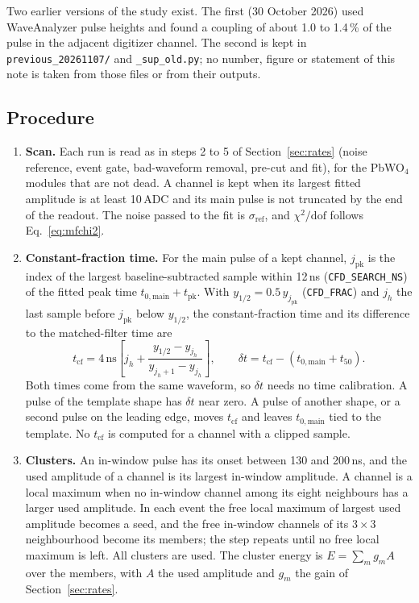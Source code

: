 \documentclass[11pt]{article}
\newcommand{\ns}{\,\mathrm{ns}}
\newcommand{\code}[1]{\texttt{#1}}
\begin{document}
Two earlier versions of the study exist. The first (30 October 2026) used WaveAnalyzer pulse heights and found a coupling of about 1.0 to 1.4\,\% of the pulse in the adjacent digitizer channel. The second is kept in \code{previous\_20261107/} and \code{\_sup\_old.py}; no number, figure or statement of this note is taken from those files or from their outputs.

\subsection{Procedure}

\begin{enumerate}
\item \textbf{Scan.} Each run is read as in steps 2 to 5 of Section~\ref{sec:rates} (noise reference, event gate, bad-waveform removal, pre-cut and fit), for the PbWO$_4$ modules that are not dead. A channel is kept when its largest fitted amplitude is at least 10\,ADC and its main pulse is not truncated by the end of the readout. The noise passed to the fit is $\sigma_{\mathrm{ref}}$, and $\chi^2/\mathrm{dof}$ follows Eq.~\eqref{eq:mfchi2}.
\item \textbf{Constant-fraction time.} For the main pulse of a kept channel, $j_{\mathrm{pk}}$ is the index of the largest baseline-subtracted sample within 12\,ns (\code{CFD\_SEARCH\_NS}) of the fitted peak time $t_{0,\mathrm{main}} + t_{\mathrm{pk}}$. With $y_{1/2} = 0.5\, y_{j_{\mathrm{pk}}}$ (\code{CFD\_FRAC}) and $j_h$ the last sample before $j_{\mathrm{pk}}$ below $y_{1/2}$, the constant-fraction time and its difference to the matched-filter time are
\begin{equation}
t_{\mathrm{cf}} = 4\ns \left[ j_h + \frac{y_{1/2} - y_{j_h}}{y_{j_h + 1} - y_{j_h}} \right],
\qquad
\delta t = t_{\mathrm{cf}} - \left( t_{0,\mathrm{main}} + t_{50} \right).
\label{eq:dtcfd}
\end{equation}
Both times come from the same waveform, so $\delta t$ needs no time calibration. A pulse of the template shape has $\delta t$ near zero. A pulse of another shape, or a second pulse on the leading edge, moves $t_{\mathrm{cf}}$ and leaves $t_{0,\mathrm{main}}$ tied to the template. No $t_{\mathrm{cf}}$ is computed for a channel with a clipped sample.
\item \textbf{Clusters.} An in-window pulse has its onset between 130 and 200\,ns, and the used amplitude of a channel is its largest in-window amplitude. A channel is a local maximum when no in-window channel among its eight neighbours has a larger used amplitude. In each event the free local maximum of largest used amplitude becomes a seed, and the free in-window channels of its $3 \times 3$ neighbourhood become its members; the step repeats until no free local maximum is left. All clusters are used. The cluster energy is $E = \sum_m g_m A$ over the members, with $A$ the used amplitude and $g_m$ the gain of Section~\ref{sec:rates}.

\end{enumerate}
\end{document}
